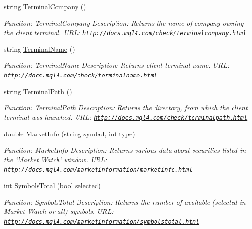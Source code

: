 \begin{DoxyCompactItemize}
string \hyperlink{class_m_q_l4_c_sharp_1_1_base_1_1_m_q_l_base_aa2c7c6058f31ed3a60e31f4383f729de}{Terminal\+Company} ()
\begin{DoxyCompactList}\small\item\em Function\+: Terminal\+Company Description\+: Returns the name of company owning the client terminal. U\+RL\+: \href{http://docs.mql4.com/check/terminalcompany.html}{\tt http\+://docs.\+mql4.\+com/check/terminalcompany.\+html} \end{DoxyCompactList}\item 
string \hyperlink{class_m_q_l4_c_sharp_1_1_base_1_1_m_q_l_base_a8070de8a0e131b67d6affa2364a1ec0e}{Terminal\+Name} ()
\begin{DoxyCompactList}\small\item\em Function\+: Terminal\+Name Description\+: Returns client terminal name. U\+RL\+: \href{http://docs.mql4.com/check/terminalname.html}{\tt http\+://docs.\+mql4.\+com/check/terminalname.\+html} \end{DoxyCompactList}\item 
string \hyperlink{class_m_q_l4_c_sharp_1_1_base_1_1_m_q_l_base_a789184cb426a73ff69e79afb5a43799a}{Terminal\+Path} ()
\begin{DoxyCompactList}\small\item\em Function\+: Terminal\+Path Description\+: Returns the directory, from which the client terminal was launched. U\+RL\+: \href{http://docs.mql4.com/check/terminalpath.html}{\tt http\+://docs.\+mql4.\+com/check/terminalpath.\+html} \end{DoxyCompactList}\item 
double \hyperlink{class_m_q_l4_c_sharp_1_1_base_1_1_m_q_l_base_a9666026eeb21c29522219f9ac5a7d504}{Market\+Info} (string symbol, int type)
\begin{DoxyCompactList}\small\item\em Function\+: Market\+Info Description\+: Returns various data about securities listed in the \char`\"{}\+Market Watch\char`\"{} window. U\+RL\+: \href{http://docs.mql4.com/marketinformation/marketinfo.html}{\tt http\+://docs.\+mql4.\+com/marketinformation/marketinfo.\+html} \end{DoxyCompactList}\item 
int \hyperlink{class_m_q_l4_c_sharp_1_1_base_1_1_m_q_l_base_a9a0bc3162e4ef4081b9e4fa2715bbe36}{Symbols\+Total} (bool selected)
\begin{DoxyCompactList}\small\item\em Function\+: Symbols\+Total Description\+: Returns the number of available (selected in Market Watch or all) symbols. U\+RL\+: \href{http://docs.mql4.com/marketinformation/symbolstotal.html}{\tt http\+://docs.\+mql4.\+com/marketinformation/symbolstotal.\+html} \end{DoxyCompactList}\item 

\end{DoxyCompactItemize}
